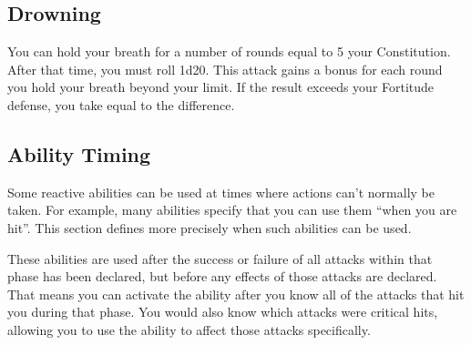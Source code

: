     \subsection{Drowning}\label{Drowning}
        You can hold your breath for a number of rounds equal to 5 \add your Constitution.
        After that time, you must roll 1d20.
        This attack gains a  bonus for each round you hold your breath beyond your limit.
        If the result exceeds your Fortitude defense, you take  equal to the difference.

    \subsection{Ability Timing}
        Some reactive abilities can be used at times where actions can't normally be taken.
        For example, many abilities specify that you can use them ``when you are hit''.
        This section defines more precisely when such abilities can be used.

         These abilities are used after the success or failure of all attacks within that phase has been declared, but before any effects of those attacks are declared.
        That means you can activate the ability after you know all of the attacks that hit you during that phase.
        You would also know which attacks were critical hits, allowing you to use the ability to affect those attacks specifically.
